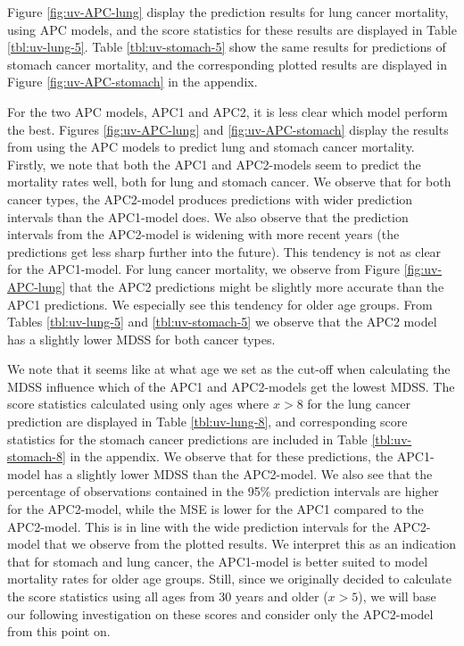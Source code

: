 \newpar Figure \ref{fig:uv-APC-lung} display the prediction results for lung cancer mortality, using APC models, and the score statistics for these results are displayed in Table \ref{tbl:uv-lung-5}. Table \ref{tbl:uv-stomach-5} show the same results for predictions of stomach cancer mortality, and the corresponding plotted results are displayed in Figure \ref{fig:uv-APC-stomach} in the appendix. 

\newpar For the two APC models, APC1 and APC2, it is less clear which model perform the best. Figures \ref{fig:uv-APC-lung} and \ref{fig:uv-APC-stomach} display the results from using the APC models to predict lung and stomach cancer mortality. Firstly, we note that both the APC1 and APC2-models seem to predict the mortality rates well, both for lung and stomach cancer. We observe that for both cancer types, the APC2-model produces predictions with wider prediction intervals than the APC1-model does. We also observe that the prediction intervals from the APC2-model is widening with more recent years (the predictions get less sharp further into the future). This tendency is not as clear for the APC1-model. For lung cancer mortality, we observe from Figure \ref{fig:uv-APC-lung} that the APC2 predictions might be slightly more accurate than the APC1 predictions. We especially see this tendency for older age groups. From Tables \ref{tbl:uv-lung-5} and \ref{tbl:uv-stomach-5} we observe that the APC2 model has a slightly lower MDSS for both cancer types.

\newpar We note that it seems like at what age we set as the cut-off when calculating the MDSS influence which of the APC1 and APC2-models get the lowest MDSS. The score statistics calculated using only ages where $x > 8$ for the lung cancer prediction are displayed in Table \ref{tbl:uv-lung-8}, and corresponding score statistics for the stomach cancer predictions are included in Table \ref{tbl:uv-stomach-8} in the appendix. We observe that for these predictions, the APC1-model has a slightly lower MDSS than the APC2-model. We also see that the percentage of observations contained in the 95\% prediction intervals are higher for the APC2-model, while the MSE is lower for the APC1 compared to the APC2-model. This is in line with the wide prediction intervals for the APC2-model that we observe from the plotted results. We interpret this as an indication that for stomach and lung cancer, the APC1-model is better suited to model mortality rates for older age groups. Still, since we originally decided to calculate the score statistics using all ages from 30 years and older ($x > 5$), we will base our following investigation on these scores and consider only the APC2-model from this point on. 

